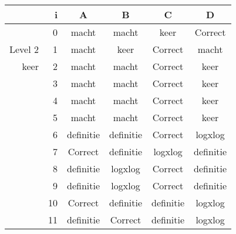 \begin{tabular}{ rr| c|c|c|c}\hline\hline
     & i & \textbf{A} & \textbf{B} & \textbf{C} & \textbf{D}\\\hline

&0&macht&macht&keer&Correct\cellcolor[gray]{0.6}\\
Level 2 & 1&macht&keer&Correct\cellcolor[gray]{0.6}&macht\\
keer &2&macht&macht&Correct\cellcolor[gray]{0.6}&keer\\
&3&macht&macht&Correct\cellcolor[gray]{0.6}&keer\\
&4&macht&macht&Correct\cellcolor[gray]{0.6}&keer\\
&5&macht&macht&Correct\cellcolor[gray]{0.6}&keer\\
&6&definitie&definitie&Correct\cellcolor[gray]{0.6}&logxlog\\
&7&Correct\cellcolor[gray]{0.6}&definitie&logxlog&definitie\\
&8&definitie&logxlog&Correct\cellcolor[gray]{0.6}&definitie\\
&9&definitie&logxlog&Correct\cellcolor[gray]{0.6}&definitie\\
&10&Correct\cellcolor[gray]{0.6}&definitie&definitie&logxlog\\
&11&definitie&Correct\cellcolor[gray]{0.6}&definitie&logxlog\\
\hline\end{tabular}\par\ \newline

